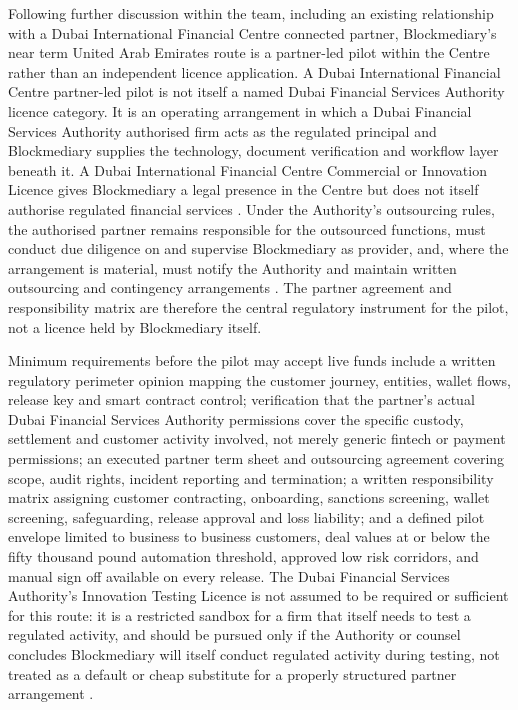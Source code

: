 \documentclass[12pt, a4paper]{article}
\begin{document}
Following further discussion within the team, including an existing relationship with a
Dubai International Financial Centre connected partner, Blockmediary's near term United
Arab Emirates route is a partner-led pilot within the Centre rather than an independent
licence application. A Dubai International Financial Centre partner-led pilot is not
itself a named Dubai Financial Services Authority licence category. It is an operating
arrangement in which a Dubai Financial Services Authority authorised firm acts as the
regulated principal and Blockmediary supplies the technology, document verification and
workflow layer beneath it. A Dubai International Financial Centre Commercial or Innovation
Licence gives Blockmediary a legal presence in the Centre but does not itself authorise
regulated financial services \citep{difcvarareport2026}. Under the Authority's outsourcing
rules, the authorised partner remains responsible for the outsourced functions, must
conduct due diligence on and supervise Blockmediary as provider, and, where the
arrangement is material, must notify the Authority and maintain written outsourcing and
contingency arrangements \citep{dfsaoutsourcing}. The partner agreement and responsibility
matrix are therefore the central regulatory instrument for the pilot, not a licence held
by Blockmediary itself.

Minimum requirements before the pilot may accept live funds include a written regulatory
perimeter opinion mapping the customer journey, entities, wallet flows, release key and
smart contract control; verification that the partner's actual Dubai Financial Services
Authority permissions cover the specific custody, settlement and customer activity
involved, not merely generic fintech or payment permissions; an executed partner term
sheet and outsourcing agreement covering scope, audit rights, incident reporting and
termination; a written responsibility matrix assigning customer contracting, onboarding,
sanctions screening, wallet screening, safeguarding, release approval and loss liability;
and a defined pilot envelope limited to business to business customers, deal values at or
below the fifty thousand pound automation threshold, approved low risk corridors, and
manual sign off available on every release. The Dubai Financial Services Authority's
Innovation Testing Licence is not assumed to be required or sufficient for this route:
it is a restricted sandbox for a firm that itself needs to test a regulated activity, and
should be pursued only if the Authority or counsel concludes Blockmediary will itself
conduct regulated activity during testing, not treated as a default or cheap substitute
for a properly structured partner arrangement \citep{difcvarareport2026}.
\end{document}

